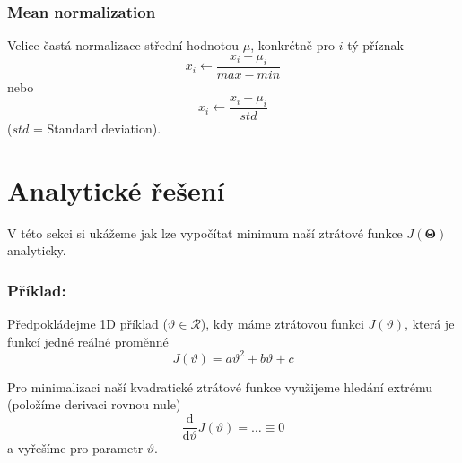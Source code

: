 \subsubsection*{Mean normalization}
\par{Velice častá normalizace střední hodnotou $\mu$, konkrétně pro $i$-tý příznak
\begin{equation}
	x_i \leftarrow \frac{x_i - \mu_i}{max - min}
\end{equation}
nebo
\begin{equation}
	x_i \leftarrow \frac{x_i - \mu_i}{std}
\end{equation}
($std$ = Standard deviation).


\newpage















\section{Analytické řešení}
\label{sec:normalEquation}

\par{V této sekci si ukážeme jak lze vypočítat minimum naší ztrátové funkce $J \left( \bm{\Theta} \right)$ analyticky.}

\subsubsection*{Příklad:}
\par{Předpokládejme 1D příklad ($\vartheta \in \mathcal{R}$), kdy máme ztrátovou funkci $J \left( \vartheta \right)$, která je funkcí jedné reálné proměnné
\begin{equation}
	J \left( \vartheta \right) = a \vartheta^2 + b \vartheta + c
\end{equation}}

\par{Pro minimalizaci naší kvadratické ztrátové funkce využijeme hledání extrému (položíme derivaci rovnou nule)
\begin{equation}
	\frac{\mathrm{d}}{\mathrm{d}\vartheta} J \left( \vartheta \right) = \ldots \equiv 0
\end{equation}
a vyřešíme pro parametr $\vartheta$.}

}
